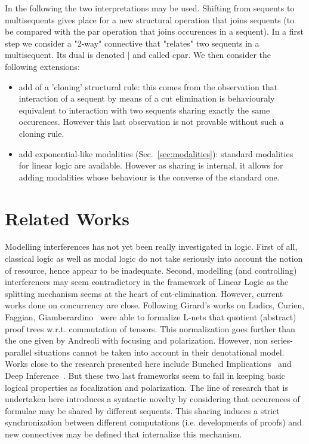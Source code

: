 \documentclass{llncs}
\newcommand{\cpar}{\mid}
\begin{document}
In the following the two interpretations may be used. 
Shifting from sequents to multisequents gives place for a new structural operation that joins sequents (to be compared with the par operation that joins occurences in a sequent). In a first step we consider a "2-way" connective that "relates" two sequents in a multisequent. Its dual is denoted $\cpar$ and called cpar.
We then consider the following extensions:
\begin{itemize}
\item add of a 'cloning' structural rule: this comes from the observation that interaction of a sequent by means of a cut elimination is behaviouraly equivalent to interaction with two sequents sharing exactly the same occurences. However this last observation is not provable without such a cloning rule.
\item add exponential-like modalities (Sec.~\ref{sec:modalities}): standard modalities for linear logic are available. However as sharing is internal, it allows for adding modalities whose behaviour is the converse of the standard one.
\end{itemize}



 
\section{Related Works}\label{sec:RelatedWorks}




Modelling interferences has not yet been really investigated in logic. First of all, classical logic as well as modal logic do not take seriously into account the notion of resource, hence appear to be inadequate. Second, modelling (and controlling) interferences may seem contradictory in the framework of Linear Logic as the splitting mechanism seems at the heart of cut-elimination. However, current works done on concurrency are close.
Following Girard's works on Ludics, Curien, Faggian, Giamberardino~\cite{DBLP:conf/csl/CurienF05,DBLP:conf/csl/GiamberardinoF06} were able to formalize L-nets that quotient (abstract) proof trees w.r.t. commutation of tensors. This normalization goes further than the one given by Andreoli with focusing and polarization.
However, non series-parallel situations cannot be taken into account in their denotational model.
Works close to the research presented here include Bunched Implications~\cite{DBLP:journals/bsl/OHearnP99} and Deep Inference~\cite{DBLP:journals/tocl/Guglielmi07}.
But these two last frameworks seem to fail in keeping basic logical properties as focalization and polarization.
The line of research that is undertaken here introduces a syntactic novelty by considering that occurences of formulae may be shared by different sequents. This sharing induces a strict synchronization between different computations (i.e. developments of proofs) and new connectives may be defined that internalize this mechanism.
\end{document}
